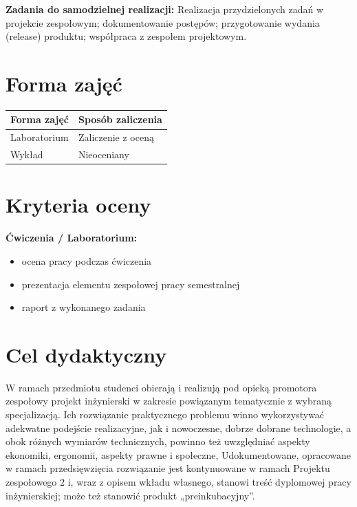 \documentclass[12pt, a4paper]{article}
\newcommand{\thdrule}{\noalign{\global\setlength{\extrarowheight}{0pt}}}
\newcommand{\thdend}{\noalign{\global\setlength{\extrarowheight}{3pt}}}
\begin{document}
\vspace{4pt}
\noindent\textbf{Zadania do samodzielnej realizacji:} Realizacja przydzielonych zadań w projekcie zespołowym; dokumentowanie postępów; przygotowanie wydania (release) produktu; współpraca z zespołem projektowym.

\section{Forma zajęć}

\begin{center}
{\scriptsize
\begin{tabular}{m{5cm}m{8cm}}
\thdrule\toprule
\rowcolor{pjatkRed} {\color{white}\textbf{Forma zajęć}} & {\color{white}\textbf{Sposób zaliczenia}} \\
\midrule\thdend
  \rowcolor{tableRowLight} Laboratorium & Zaliczenie z oceną \\
  \rowcolor{tableRowAlt} Wykład & Nieoceniany \\
\bottomrule
\end{tabular}}
\end{center}

\section{Kryteria oceny}

\textbf{Ćwiczenia / Laboratorium:}
\begin{itemize}
  \item ocena pracy podczas ćwiczenia
  \item prezentacja elementu zespołowej pracy semestralnej
  \item raport z wykonanego zadania
\end{itemize}


\section{Cel dydaktyczny}

W ramach przedmiotu studenci obierają i realizują pod opieką promotora zespołowy projekt inżynierski w zakresie powiązanym tematycznie z wybraną specjalizacją. Ich rozwiązanie praktycznego problemu winno wykorzystywać adekwatne podejście realizacyjne, jak i nowoczesne, dobrze dobrane technologie, a obok różnych wymiarów technicznych, powinno też uwzględniać aspekty ekonomiki, ergonomii, aspekty prawne i społeczne, Udokumentowane, opracowane w ramach przedsięwzięcia rozwiązanie jest kontynuowane w ramach Projektu zespołowego 2 i, wraz z opisem wkładu własnego, stanowi treść dyplomowej pracy inżynierskiej; może też stanowić produkt „preinkubacyjny”.
\end{document}
